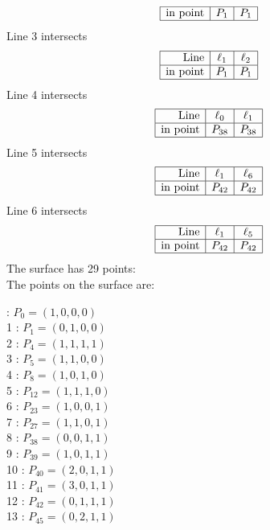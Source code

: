 \documentclass{article}
\begin{document}
{$$\begin{array}{|r*{2}{|c}|}
\hline
\mbox{in point}  & P_{1} & P_{1}\\
\hline
\end{array}
$$
Line 3 intersects 
$$
\begin{array}{|r*{2}{|c}|}
\hline
\mbox{Line}  & \ell_{1} & \ell_{2}\\
\hline
\mbox{in point}  & P_{1} & P_{1}\\
\hline
\end{array}
$$
Line 4 intersects 
$$
\begin{array}{|r*{2}{|c}|}
\hline
\mbox{Line}  & \ell_{0} & \ell_{1}\\
\hline
\mbox{in point}  & P_{38} & P_{38}\\
\hline
\end{array}
$$
Line 5 intersects 
$$
\begin{array}{|r*{2}{|c}|}
\hline
\mbox{Line}  & \ell_{1} & \ell_{6}\\
\hline
\mbox{in point}  & P_{42} & P_{42}\\
\hline
\end{array}
$$
Line 6 intersects 
$$
\begin{array}{|r*{2}{|c}|}
\hline
\mbox{Line}  & \ell_{1} & \ell_{5}\\
\hline
\mbox{in point}  & P_{42} & P_{42}\\
\hline
\end{array}
$$
The surface has 29 points:\\
The points on the surface are:\\
\begin{multicols}{3}
 : $P_{0}=( 1, 0, 0, 0 )$\\
1 : $P_{1}=( 0, 1, 0, 0 )$\\
2 : $P_{4}=( 1, 1, 1, 1 )$\\
3 : $P_{5}=( 1, 1, 0, 0 )$\\
4 : $P_{8}=( 1, 0, 1, 0 )$\\
5 : $P_{12}=( 1, 1, 1, 0 )$\\
6 : $P_{23}=( 1, 0, 0, 1 )$\\
7 : $P_{27}=( 1, 1, 0, 1 )$\\
8 : $P_{38}=( 0, 0, 1, 1 )$\\
9 : $P_{39}=( 1, 0, 1, 1 )$\\
10 : $P_{40}=( 2, 0, 1, 1 )$\\
11 : $P_{41}=( 3, 0, 1, 1 )$\\
12 : $P_{42}=( 0, 1, 1, 1 )$\\
13 : $P_{45}=( 0, 2, 1, 1 )$\\

\end{multicols}}
\end{document}
